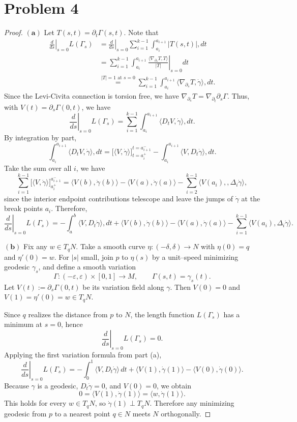 \documentclass[12pt]{article}
\begin{document}
\section*{Problem 4}
\begin{proof}
  $\mathbf{(a)}$ Let $T(s,t)=\partial_t \Gamma(s,t)$. Note that 
  $$
  \begin{aligned}
\left.\frac{d}{ds}\right|_{s=0} L(\Gamma_s)
&=\left.\frac{d}{ds}\right|_{s=0}\sum_{i=1}^{k-1}\int_{a_i}^{a_{i+1}}|T(s,t)|,dt\\
&=\sum_{i=1}^{k-1}\int_{a_i}^{a_{i+1}}
\left.\frac{\langle\nabla_{\partial_s}T,T\rangle}{|T|}\right|_{s=0} dt\\
&\overset{|T|=1\text{ at }s=0}{=}\sum_{i=1}^{k-1}\int_{a_i}^{a_{i+1}}
\langle\nabla_{\partial_s}T,\dot\gamma\rangle,dt .
\end{aligned}
  $$
  Since the Levi-Civita connection is torsion free, we have $\nabla_{\partial_s}T=\nabla_{\partial_t}\partial_s\Gamma.$
  Thus, with $V(t)=\partial_s\Gamma(0,t)$, we have 
  $$
  \left.\frac{d}{ds}\right|_{s=0} L(\Gamma_s)=\sum_{i=1}^{k-1}\int_{a_i}^{a_{i+1}}\langle D_t V,\dot\gamma\rangle,dt .
  $$
  By integration by part, 
  $$
  \int_{a_i}^{a_{i+1}}\langle D_t V,\dot\gamma\rangle,dt=\big[\langle V,\dot\gamma\rangle\big]_{t=a_i^+}^{t=a_{i+1}^-}
-\int_{a_i}^{a_{i+1}}\langle V, D_t\dot\gamma\rangle,dt .
  $$
  Take the sum over all $i$, we have 
  $$
  \sum_{i=1}^{k-1}\big[\langle V,\dot\gamma\rangle\big]_{a_i^+}^{a_{i+1}^-}
= \langle V(b),\dot\gamma(b)\rangle-\langle V(a),\dot\gamma(a)\rangle
-\sum_{i=2}^{k-1}\langle V(a_i),,\Delta_i\dot\gamma\rangle ,
$$
since the interior endpoint contributions telescope and leave the jumps of
$\dot\gamma$ at the break points $a_i$. Therefore, 
$$
\left.\frac{d}{ds}\right|_{s=0} L(\Gamma_s)
= -\int_{a}^{b}\langle V, D_t\dot\gamma\rangle,dt
+\langle V(b),\dot\gamma(b)\rangle
-\langle V(a),\dot\gamma(a)\rangle
-\sum_{i=1}^{k-1}\langle V(a_i),\Delta_i\dot\gamma\rangle.
$$

$\mathbf{(b)}$ 
Fix any $w\in T_qN$. Take a smooth curve $\eta:(-\delta,\delta)\to N$ with
$\eta(0)=q$ and $\eta'(0)=w$. For $|s|$ small, join $p$ to $\eta(s)$ by a
unit--speed minimizing geodesic $\gamma_s$, and define a smooth variation
\[
\Gamma:(-\varepsilon,\varepsilon)\times[0,1]\to M,\qquad
\Gamma(s,t)=\gamma_s(t).
\]
Let $V(t):=\partial_s\Gamma(0,t)$ be its variation field along $\gamma$.
Then $V(0)=0$ and $V(1)=\eta'(0)=w\in T_qN$.

Since $q$ realizes the distance from $p$ to $N$, the length function
$L(\Gamma_s)$ has a minimum at $s=0$, hence
\[
\left.\frac{d}{ds}\right|_{s=0} L(\Gamma_s)=0.
\]
Applying the first variation formula from part (a),
\[
\left.\frac{d}{ds}\right|_{s=0}L(\Gamma_s)
= -\int_{0}^{1}\!\langle V, D_t\dot\gamma\rangle\,dt
   +\langle V(1),\dot\gamma(1)\rangle
   -\langle V(0),\dot\gamma(0)\rangle .
\]
Because $\gamma$ is a geodesic, $D_t\dot\gamma=0$, and $V(0)=0$, we obtain
\[
0=\langle V(1),\dot\gamma(1)\rangle=\langle w,\dot\gamma(1)\rangle .
\]
This holds for every $w\in T_qN$, so $\dot\gamma(1)\perp T_qN$. Therefore any
minimizing geodesic from $p$ to a nearest point $q\in N$ meets $N$
orthogonally.
\end{proof}
\end{document}
